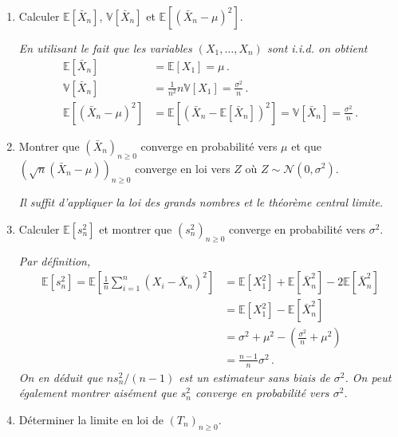 \documentclass[a4paper,10pt,fleqn]{article}
\newcommand{\1}{\ensuremath{\mathbbm{1}}}
\begin{document}
\begin{enumerate}
\item Calculer $\mathbb{E}[\bar X_n]$, $\mathbb{V}[\bar X_n]$ et $\mathbb{E}[(\bar X_n-\mu)^2]$.

\vspace{.2cm}

{\em 
En utilisant le fait que les variables $(X_1,\ldots,X_n)$  sont i.i.d. on obtient
\begin{align*}
\mathbb{E}[\bar X_n] &= \mathbb{E}[X_1] = \mu  \,.\\
\mathbb{V}[\bar X_n] &= \frac{1}{n^2}n \mathbb{V}[X_1]  =  \frac{\sigma^2}{n} \,.\\
\mathbb{E}[(\bar X_n-\mu)^2] &= \mathbb{E}[(\bar X_n-\mathbb{E}[\bar X_n])^2] = \mathbb{V}[\bar X_n]  =   \frac{\sigma^2}{n} \,.
\end{align*}
}

\item Montrer que $(\bar X_n)_{n\geq 0}$ converge en probabilit\'e vers $\mu$ et que $(\sqrt{n}(\bar X_n-\mu))_{n\geq 0}$  converge en loi vers $Z$ o\`u $ Z\sim \mathcal{N}(0,\sigma^2)$.

\vspace{.2cm}

{\em Il suffit d'appliquer la loi des grands nombres et le th\'eor\`eme central limite.}

\item Calculer $\mathbb{E}[s^2_n]$ et montrer que $(s^2_n)_{n\geq 0}$ converge en probabilit\'e vers $\sigma^2$.

\vspace{.2cm}

{\em 
Par d\'efinition,
\begin{align*}
\mathbb{E}[s^2_n] = \mathbb{E}\left[\frac{1}{n}\sum_{i=1}^n (X_i-\bar X_n)^2\right] &=  \mathbb{E}[X_1^2] + \mathbb{E}[\bar X_n ^2] -2 \mathbb{E}[\bar X_n ^2] \\
&=\mathbb{E}[X_1^2] - \mathbb{E}[\bar X_n ^2] \\
&= \sigma^2 + \mu^2 - \left(\frac{\sigma^2}{n} + \mu^2\right)\\
&= \frac{n-1}{n}\sigma^2\,.
\end{align*}
On en d\'eduit que $n s_n^2/(n-1)$ est un estimateur sans biais de $\sigma^2$. On peut \'egalement montrer ais\'ement que $s_n^2$ converge en probabilit\'e vers $\sigma^2$.
}

\item D\'eterminer la limite en loi de $(T_n)_{n\geq 0}$.


\end{enumerate}
\end{document}
